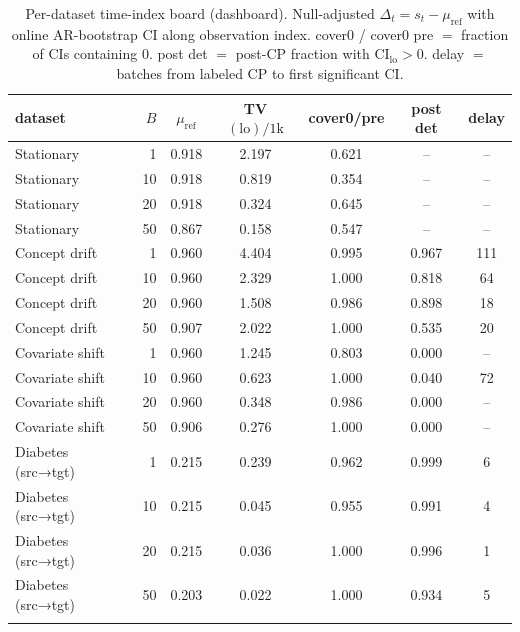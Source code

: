 \begin{table}[ht]
\centering
\caption{Per-dataset time-index board (dashboard). Null-adjusted $\Delta_t=s_t-\mu_{\mathrm{ref}}$ with online AR-bootstrap CI along observation index. cover0 / cover0 pre $=$ fraction of CIs containing $0$. post det $=$ post-CP fraction with CI$_{\mathrm{lo}}>0$. delay $=$ batches from labeled CP to first significant CI.}
\label{tab:multidataset-timeindex-boot-ci}
\small
\begin{tabular}{@{}l r ccccc@{}}
\toprule
dataset & $B$ & $\mu_{\mathrm{ref}}$ & TV$(\mathrm{lo})/1\mathrm{k}$ & cover0/pre & post det & delay \\
\midrule
Stationary & 1 & 0.918 & 2.197 & 0.621 & -- & -- \\
Stationary & 10 & 0.918 & 0.819 & 0.354 & -- & -- \\
Stationary & 20 & 0.918 & 0.324 & 0.645 & -- & -- \\
Stationary & 50 & 0.867 & 0.158 & 0.547 & -- & -- \\
\addlinespace
Concept drift & 1 & 0.960 & 4.404 & 0.995 & 0.967 & 111 \\
Concept drift & 10 & 0.960 & 2.329 & 1.000 & 0.818 & 64 \\
Concept drift & 20 & 0.960 & 1.508 & 0.986 & 0.898 & 18 \\
Concept drift & 50 & 0.907 & 2.022 & 1.000 & 0.535 & 20 \\
\addlinespace
Covariate shift & 1 & 0.960 & 1.245 & 0.803 & 0.000 & -- \\
Covariate shift & 10 & 0.960 & 0.623 & 1.000 & 0.040 & 72 \\
Covariate shift & 20 & 0.960 & 0.348 & 0.986 & 0.000 & -- \\
Covariate shift & 50 & 0.906 & 0.276 & 1.000 & 0.000 & -- \\
\addlinespace
Diabetes (src→tgt) & 1 & 0.215 & 0.239 & 0.962 & 0.999 & 6 \\
Diabetes (src→tgt) & 10 & 0.215 & 0.045 & 0.955 & 0.991 & 4 \\
Diabetes (src→tgt) & 20 & 0.215 & 0.036 & 1.000 & 0.996 & 1 \\
Diabetes (src→tgt) & 50 & 0.203 & 0.022 & 1.000 & 0.934 & 5 \\
\addlinespace
\bottomrule
\end{tabular}
\end{table}
